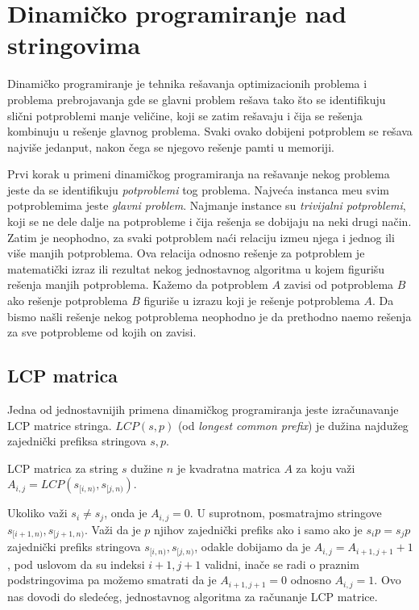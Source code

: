\section{Dinami\v cko programiranje nad stringovima}

Dinami\v cko programiranje je tehnika re\v savanja optimizacionih problema i problema prebrojavanja gde se glavni problem re\v sava tako \v sto se identifikuju sli\v cni potproblemi manje veli\v cine, koji se zatim re\v savaju i \v cija se re\v senja kombinuju u re\v senje glavnog problema. Svaki ovako dobijeni potproblem se re\v sava najvi\v se jedanput, nakon \v cega se njegovo re\v senje pamti u memoriji.

Prvi korak u primeni dinami\v ckog programiranja na re\v savanje nekog problema jeste da se identifikuju \textit{potproblemi} tog problema. Najve\' ca instanca me\dj u svim potproblemima jeste \textit{glavni problem}. Najmanje instance su \textit{trivijalni potproblemi}, koji se ne dele dalje na potprobleme i \v cija re\v senja se dobijaju na neki drugi na\v cin. Zatim je neophodno, za svaki potproblem na\' ci relaciju izme\dj u njega i jednog ili vi\v se manjih potproblema. Ova relacija odnosno re\v senje za potproblem je matemati\v cki izraz ili rezultat nekog jednostavnog algoritma u kojem figuri\v su re\v senja manjih potproblema. Ka\v zemo da potproblem $A$ zavisi od potproblema $B$ ako re\v senje potproblema $B$ figuri\v se u izrazu koji je re\v senje potproblema $A$. Da bismo na\v sli re\v senje nekog potproblema neophodno je da prethodno na\dj emo re\v senja za sve potprobleme od kojih on zavisi.

\subsection{LCP matrica}

Jedna od jednostavnijih primena dinami\v ckog programiranja jeste izra\v cunavanje LCP matrice stringa. $LCP(s, p)$ (od \textit{longest common prefix}) je du\v zina najdu\v zeg zajedni\v cki prefiksa stringova $s,p$.

\begin{dfn}
LCP matrica za string $s$ du\v zine $n$ je kvadratna matrica $A$ za koju va\v zi $A_{i,j} = LCP(s_{[i,n)}, s_{[j, n)})$.
\end{dfn}

Ukoliko va\v zi $s_i \not = s_j$, onda je $A_{i,j} = 0$. U suprotnom, posmatrajmo stringove $s_{[i+1,n)}, s_{[j+1,n)}$. Va\v zi da je $p$ njihov zajedni\v cki prefiks ako i samo ako je $s_ip = s_jp$ zajedni\v cki prefiks stringova $s_{[i,n)}, s_{[j,n)}$, odakle dobijamo da je $A_{i,j} = A_{i+1,j+1}+1$, pod uslovom da su indeksi $i+1,j+1$ validni, ina\v ce se radi o praznim podstringovima pa mo\v zemo smatrati da je $A_{i+1,j+1} = 0$ odnosno $A_{i,j} = 1$. Ovo nas dovodi do slede\' ceg, jednostavnog algoritma za ra\v cunanje LCP matrice.

